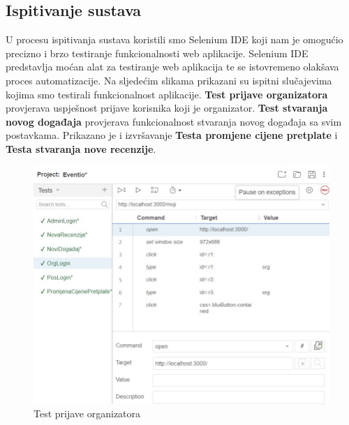 			
			\subsection{Ispitivanje sustava}
			
			U procesu ispitivanja sustava koristili smo Selenium IDE koji nam je omogućio precizno i brzo testiranje funkcionalnosti web aplikacije. Selenium IDE predstavlja moćan alat za testiranje web aplikacija te se istovremeno olakšava proces automatizacije. \newline Na sljedećim slikama prikazani su ispitni slučajevima kojima smo testirali funkcionalnost aplikacije. \textbf{Test prijave organizatora} provjerava uspješnost prijave korisnika koji je organizator. \textbf{Test stvaranja novog događaja} provjerava funkcionalnost stvaranja novog događaja sa svim postavkama. Prikazano je i izvršavanje \textbf{Testa promjene cijene pretplate} i \textbf{Testa stvaranja nove recenzije}.
			
			\begin{figure}[H]
				\includegraphics[scale=0.45]{testovi/selOrgLogin.jpeg}
				\centering
				\caption{Test prijave organizatora}
				\label{fig:promjene}
			\end{figure}
			
